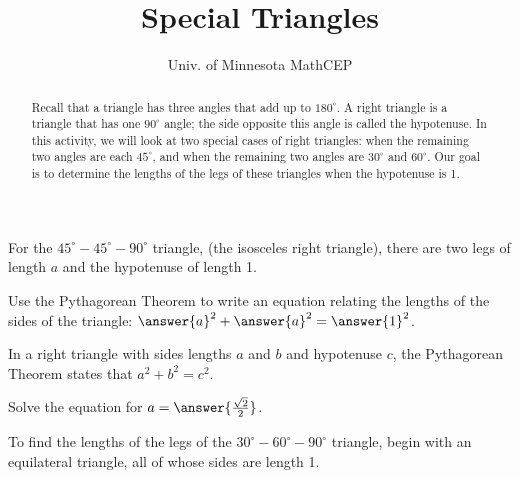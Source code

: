 \documentclass[number]{ximera}
\title{Special Triangles}
\author{Univ. of Minnesota MathCEP}
\begin{document}
\begin{abstract}
Recall that a triangle has three angles that add up to $180^\circ$.
A right triangle is a triangle that has one $90^\circ$ angle; the side opposite this angle is called the hypotenuse.
In this activity, we will look at two special cases of right triangles: when the remaining two angles are each $45^\circ$, and when the remaining two angles are $30^\circ$ and $60^\circ$.
Our goal is to determine the lengths of the legs of these triangles when the hypotenuse is 1.
\end{abstract}

\maketitle

For the $45^\circ-45^\circ-90^\circ$ triangle, (the isosceles right triangle), there are two legs of length $a$
and the hypotenuse of length 1.
\begin{image}
\end{image}


\begin{problem}
Use the Pythagorean Theorem to write an equation relating the lengths of the sides of the triangle: $\answer{a}^2+\answer{a}^2=\answer{1}^2$.
\begin{hint}
In a right triangle with sides lengths $a$ and $b$ and hypotenuse $c$, the Pythagorean Theorem states that $a^2+b^2=c^2$.
\end{hint}

\end{problem}

\begin{problem}
Solve the equation for $a = \answer{\frac{\sqrt{2}}{2}}$.
\end{problem}

To find the lengths of the legs of the $30^\circ-60^\circ-90^\circ$ triangle, begin with an equilateral triangle, all of whose sides are length 1.

\begin{image}
\end{image}
\end{document}
